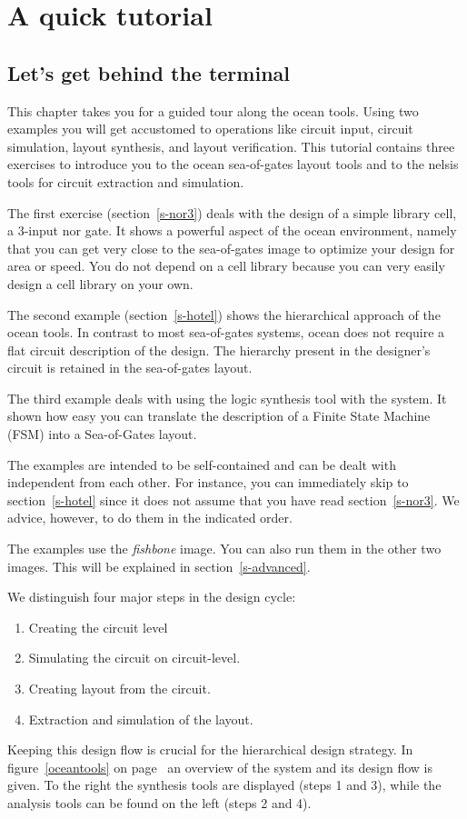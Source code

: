 
\chapter{A quick tutorial}
\label{tutorial}
\section{Let's get behind the terminal}
This chapter takes you for a guided tour along the {\sc ocean} tools.
Using two examples you will get accustomed to operations like circuit
input, circuit simulation, layout synthesis, and layout verification.  This
tutorial contains three exercises to introduce you to the {\sc ocean}
sea-of-gates layout tools and to the {\sc nelsis} tools for circuit
extraction and simulation.

The first exercise (section~\ref{s-nor3}) deals with the design of a simple
library cell, a 3-input {\sc nor} gate. It shows a powerful aspect of the {\sc
ocean} environment, namely that you can get very close to the sea-of-gates
image to optimize your design for area or speed. You do not depend on a cell
library because you can very easily design a cell library on your own.

The second example (section~\ref{s-hotel}) shows the hierarchical approach of
the {\sc ocean} tools. In contrast to most sea-of-gates systems, {\sc ocean}
does not require a flat circuit description of the design. The hierarchy
present in the designer's circuit is retained in the sea-of-gates layout.

The third example deals with using the logic synthesis tool  with the
 system. It shown how easy you can translate the description of a
Finite State Machine (FSM)  into a Sea-of-Gates layout.

The examples are intended to be self-contained and can be dealt with
independent from each other. For instance, you can immediately skip to
section~\ref{s-hotel} since it does not assume that you have read
section~\ref{s-nor3}. We advice, however, to do them in the indicated order.

The examples use the {\sl fishbone} image. You can also run them in the other
two images. This will be explained in section~\ref{s-advanced}.

We distinguish four major steps in the design cycle:
\begin{enumerate}
\item
Creating the circuit level
\item
Simulating the circuit on circuit-level.
\item
Creating layout from the circuit.
\item
Extraction and simulation of the layout.
\end{enumerate}
Keeping this design flow is crucial for the hierarchical design strategy. In
figure~\ref{oceantools} on page~\pageref{oceantools} an overview of the system
and its design flow is given. To the right the synthesis tools are displayed
(steps 1 and 3), while the analysis tools can be found on the left (steps 2 and
4).

